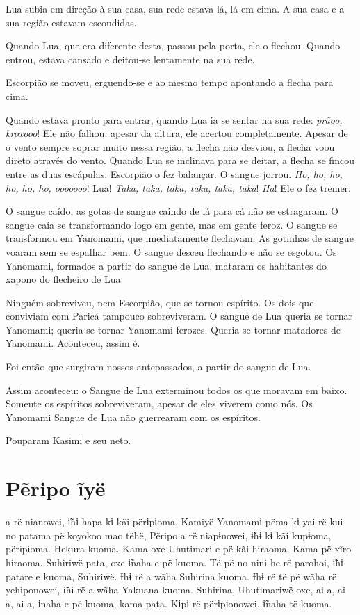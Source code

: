 Lua subia em direção à sua casa, sua rede estava lá, lá em cima. A sua
casa e a sua região estavam escondidas. 

Quando Lua, que era diferente desta, passou pela porta, ele o flechou.
Quando entrou, estava cansado e deitou-se lentamente na sua rede. 

Escorpião se moveu, erguendo-se e ao mesmo tempo apontando a flecha
para cima. 

Quando estava pronto para entrar, quando Lua ia se sentar na sua
rede: \textit{prãoo, kroxooo}! Ele não falhou: apesar da altura, ele
acertou completamente. Apesar de o vento sempre soprar muito nessa região,
a flecha não desviou, a flecha voou direto através do vento. Quando Lua se inclinava para se deitar, a flecha se fincou entre as duas
escápulas. Escorpião o fez balançar. O sangue jorrou. \textit{Ho, ho, ho,
ho, ho, ho, ooooooo}! Lua! \textit{Taka, taka, taka, taka, taka,
taka}! \textit{Ha}! Ele o fez tremer. 

O sangue caído, as gotas de sangue caindo de lá para cá não se
estragaram. O sangue caía se transformando logo em gente, mas em
gente feroz. O sangue se transformou em Yanomami, que imediatamente
flechavam. As gotinhas de sangue voaram sem se espalhar bem. O sangue
desceu flechando e não se esgotou. Os Yanomami, formados a partir
do sangue de Lua, mataram os habitantes do xapono do flecheiro de Lua. 

Ninguém sobreviveu, nem Escorpião, que se tornou espírito. Os dois que
conviviam com Paricá tampouco sobreviveram. O sangue de Lua queria se
tornar Yanomami; queria se tornar Yanomami ferozes. Queria se tornar
matadores de Yanomami. Aconteceu, assim é. 

Foi então que surgiram nossos antepassados, a partir do sangue de Lua. 

Assim aconteceu: o Sangue de Lua exterminou todos os que moravam em
baixo. Somente os espíritos sobreviveram, apesar de eles viverem como
nós. Os Yanomami Sangue de Lua não guerrearam com os espíritos.

Pouparam Kasimi e seu neto. 

\chapter{Pẽripo ĩyë}

 a rë nianowei, ɨ̃hɨ hapa kɨ kãi përɨpɨoma. Kamiyë Yanomamɨ pëma kɨ
yai rë kui no patama pë koyokoo mao tëhë, Pẽripo a rë niapɨnowei, ɨ̃hɨ kɨ
kãi kupɨoma, përɨpɨoma. Hekura kuoma. Kama oxe Uhutimari e pë kãi
hiraoma. Kama pë xĩro hiraoma. Suhiriwë pata, oxe ɨ̃naha e pë kuoma. Të
pë no nini he rë parohoi, ɨ̃hɨ patare e kuoma, Suhiriwë. Ɨhɨ rë a wãha
Suhirina kuoma. Ɨhɨ rë të pë wãha rë yehiponowei, ɨ̃hɨ rë a wãha Yakuana
kuoma. Suhirina, Uhutimariwë oxe, ai a, ai a, ai a, ɨnaha e pë kuoma,
kama pata. Kɨpɨ rë përɨpɨonowei, ɨ̃naha të kuoma. 

